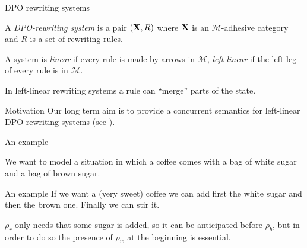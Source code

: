 \documentclass[usenames,dvipsnames]{beamer}
\def\X{\textbf {\textup{X}}}
\begin{document}
\begin{frame}{DPO rewriting systems}\justifying
		\begin{definition}
		A \emph{DPO-rewriting system} is a pair $(\X, R)$ where $\X$ is an $\mathcal{M}$-adhesive category and $R$ is a set of rewriting rules.
		\pause 
		
		A system is \emph{linear} if every rule is made by arrows in $\mathcal{M}$, \emph{left-linear} if the left leg of every rule is in $\mathcal{M}$.
	\end{definition}

\pause 

In left-linear rewriting systems a rule can ``merge'' parts of the state.

\pause 
\begin{alertblock}{Motivation}
	Our long term aim is to provide a concurrent semantics for left-linear DPO-rewriting systems (see \cite{baldan2021concurrent}). 
\end{alertblock}

\end{frame}


\begin{frame}{An example}\justifying
	
	We want to model a situation in which a coffee comes
	with a bag of white sugar and a bag of brown sugar.
	
	\pause 
\begin{figure}
	

\end{figure}
\end{frame} 

\begin{frame}{An example}\justifying
	If we want a (very sweet) coffee we can add first the white sugar and then the brown one. Finally we can stir it.
	\pause 
\begin{figure}
	
\end{figure}\pause 

$\rho_r$ only needs that some sugar is added, so it can be anticipated before $\rho_b$, but in order to do so the presence of $\rho_w$ at the beginning is essential.
\end{frame}
\end{document}
